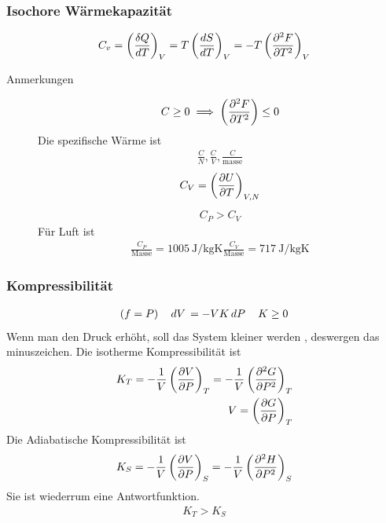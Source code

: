 \subsubsection*{Isochore Wärmekapazität}
%
\begin{align*}
  C_v = \left(\frac{ \delta Q}{dT} \right)_V = T \left( \frac{d{S}}{d{T}} \right)_V
  = - T \left( \frac{\partial ^2 F }{\partial T^2} \right)_V
\end{align*}
%
\begin{description}
  \item[Anmerkungen] 
    \begin{align*}
      C \ge 0 \implies \left( \frac{\partial ^2 F }{\partial T^2} \right) \le 0
    \end{align*}
    Die spezifische Wärme ist
    \begin{align*}
\frac{      C}{N},\frac{ C}{V},\frac{ C}{\text{masse}}
    \end{align*}
    \begin{align*}
      C_V = \left( \frac{\partial U }{\partial T} \right)_{V, N}
    \end{align*}
    \begin{align*}
      C_P > C_V
    \end{align*}
    Für Luft ist 
    \begin{align*}
\frac{      C_P}{\text{Masse}} = \SI{1005}{\joule\per\kilogram\kelvin}
\frac{      C_V}{\text{Masse}} = \SI{717}{\joule\per\kilogram\kelvin}
    \end{align*}
\end{description}
\subsubsection*{Kompressibilität}
%
\begin{align*}
  (f = P) && \,dV\, = - V K \,dP\, && K \ge 0
\end{align*}
%
Wenn man den Druck erhöht, soll das System kleiner werden , deswergen das minuszeichen.
Die isotherme Kompressibilität ist
%
\begin{align*}
  K_T = -\frac{ 1}{V} \left( \frac{\partial V }{\partial P} \right)_{T} = 
  -\frac{1}{V} \left( \frac{\partial ^2 G }{\partial P^2} \right)_T \\
  V = \left( \frac{\partial G }{\partial P} \right)_T
\end{align*}
%
Die Adiabatische Kompressibilität ist
\begin{align*}
  K_S = -\frac{ 1}{V} \left( \frac{\partial V }{\partial P} \right)_S = -\frac{ 1}{V}
  \left( \frac{\partial ^2 H }{\partial P^2} \right)_{S}
\end{align*}
%
Sie ist wiederrum eine Antwortfunktion.
%
\begin{align*}
  K_T > K_S
\end{align*}
%
